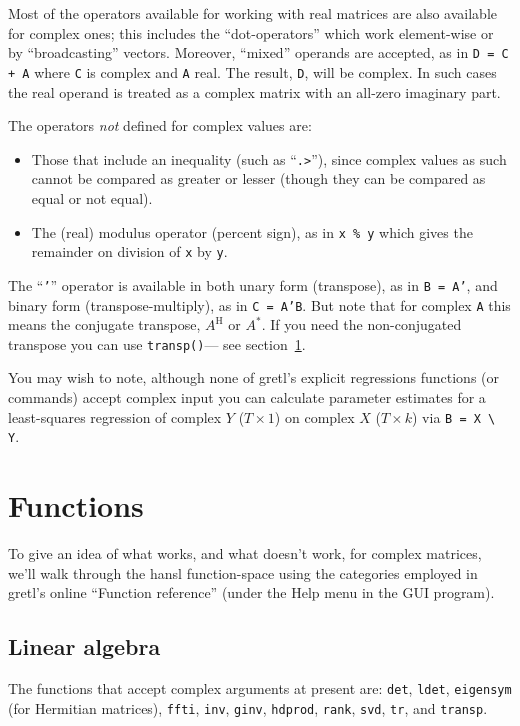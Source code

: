 \documentclass{article}
\begin{document}
Most of the operators available for working with real matrices are
also available for complex ones; this includes the ``dot-operators''
which work element-wise or by ``broadcasting'' vectors. Moreover,
``mixed'' operands are accepted, as in \texttt{D = C + A} where
\texttt{C} is complex and \texttt{A} real. The result, \texttt{D},
will be complex. In such cases the real operand is treated as a
complex matrix with an all-zero imaginary part.

The operators \textit{not} defined for complex values are:
\begin{itemize}
\item Those that include an inequality (such as ``\verb+.>+''), since
  complex values as such cannot be compared as greater or lesser
  (though they can be compared as equal or not equal).
\item The (real) modulus operator (percent sign), as in \texttt{x \%
    y} which gives the remainder on division of \texttt{x} by
  \texttt{y}.
\end{itemize}

The ``\texttt{'}'' operator is available in both unary form
(transpose), as in \texttt{B = A'}, and binary form
(transpose-multiply), as in \texttt{C = A'B}. But note that for
complex \texttt{A} this means the conjugate transpose, $A^\mathrm{H}$ or
$A^*$. If you need the non-conjugated transpose you can use
\texttt{transp()}--- see section~\ref{sec:funcs}.

You may wish to note, although none of gretl's explicit regressions
functions (or commands) accept complex input you can calculate
parameter estimates for a least-squares regression of complex $Y$
($T \times 1$) on complex $X$ ($T \times k$) via \verb|B = X \ Y|.

\section{Functions}
\label{sec:funcs}

To give an idea of what works, and what doesn't work, for complex
matrices, we'll walk through the hansl function-space using the
categories employed in gretl's online ``Function reference'' (under the
\textsf{Help} menu in the GUI program).

\subsection{Linear algebra}

The functions that accept complex arguments at present are:
\texttt{det}, \texttt{ldet}, \texttt{eigensym} (for Hermitian
matrices), \texttt{ffti}, \texttt{inv}, \texttt{ginv},
\texttt{hdprod}, \texttt{rank}, \texttt{svd}, \texttt{tr}, and
\texttt{transp}.
\end{document}
